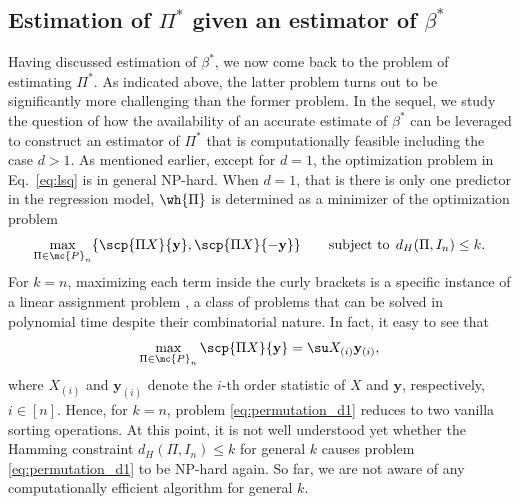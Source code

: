 \documentclass[11pt]{article}
\def\y{\mathbf{y}}
\begin{document}
\subsection{Estimation of $\Pi^*$ given an estimator of $\beta^*$}\label{subsec:permutationrecovery}
Having discussed estimation of $\beta^*$, we now come back to the problem of estimating $\Pi^*$. As indicated above, the latter problem turns out to be significantly more challenging than the former problem. In the sequel, we study the question of how the availability of an accurate estimate of $\beta^*$ can be leveraged to construct an estimator of $\Pi^*$ that is computationally feasible including the case $d > 1$. As mentioned earlier, except for $d=1$, the optimization problem in Eq.~\eqref{eq:lsq} 
is in general NP-hard. When $d=1$, that is there is only one predictor in the regression model, $\wh{\Pi}$ is determined as a minimizer of the optimization problem 
\begin{equation}\label{eq:permutation_d1}
\max_{\Pi \in \mc{P}_{n}} \{\scp{\Pi X}{\y},\scp{\Pi X}{-\y} \}  \qquad \text{subject to} \;\, d_H(\Pi, I_n) \leq k. 
\end{equation}
For $k = n$, maximizing each term inside the curly brackets is a specific instance of a linear assignment problem \cite{Burkard2009}, a class of problems that can be solved in polynomial time despite their combinatorial nature. In fact, it easy to see that
\begin{equation}\label{eq:maximuminnerproduct}
\max_{\Pi \in \mc{P}_{n}} \scp{\Pi X}{\y} = \su X_{(i)} \y_{(i)},
\end{equation}
where $X_{(i)}$ and $\y_{(i)}$ denote the $i$-th order statistic of $X$ and $\y$, respectively, $i \in [n]$. Hence, for $k = n$, problem
\eqref{eq:permutation_d1} reduces to two vanilla sorting operations. At this point, it is not well understood yet whether the
Hamming constraint $d_H(\Pi, I_n) \leq  k$ for general $k$ causes problem \eqref{eq:permutation_d1} to be NP-hard again. So far, we are not aware of any computationally efficient algorithm for general $k$.
\end{document}
